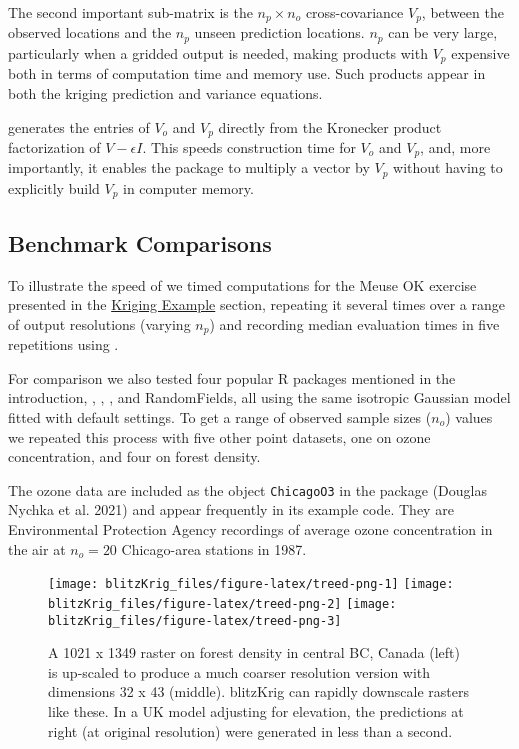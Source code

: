 The second important sub-matrix is the \(n_p \times n_o\) cross-covariance \(V_p\), between the observed locations and the \(n_p\) unseen prediction locations. \(n_p\) can be very large, particularly when a gridded output is needed, making products with \(V_p\) expensive both in terms of computation time and memory use. Such products appear in both the kriging prediction and variance equations.

 generates the entries of \(V_o\) and \(V_p\) directly from the Kronecker product factorization of \(V - \epsilon I\). This speeds construction time for \(V_o\) and \(V_p\), and, more importantly, it enables the package to multiply a vector by \(V_p\) without having to explicitly build \(V_p\) in computer memory.

\hypertarget{benchmark-comparisons}{%
\subsection{Benchmark Comparisons}\label{benchmark-comparisons}}

To illustrate the speed of  we timed computations for the Meuse OK exercise presented in the \protect\hyperlink{kriging-example}{Kriging Example} section, repeating it several times over a range of output resolutions (varying \(n_p\)) and recording median evaluation times in five repetitions using .

For comparison we also tested four popular R packages mentioned in the introduction, , , , and RandomFields, all using the same isotropic Gaussian model fitted with default settings. To get a range of observed sample sizes (\(n_o\)) values we repeated this process with five other point datasets, one on ozone concentration, and four on forest density.

The ozone data are included as the object \texttt{ChicagoO3} in the  package (Douglas Nychka et al. 2021) and appear frequently in its example code. They are Environmental Protection Agency recordings of average ozone concentration in the air at \(n_o=20\) Chicago-area stations in 1987.

\begin{figure}[htb]
\texttt{[image: blitzKrig\_files/figure-latex/treed-png-1]} \texttt{[image: blitzKrig\_files/figure-latex/treed-png-2]} \texttt{[image: blitzKrig\_files/figure-latex/treed-png-3]} \caption{A 1021 x 1349 raster on forest density in central BC, Canada (left) is up-scaled to produce a much coarser resolution version with dimensions 32 x 43 (middle). blitzKrig can rapidly downscale rasters like these. In a UK model adjusting for elevation, the predictions at right (at original resolution) were generated in less than a second.}\label{fig:treed-png}
\end{figure}

